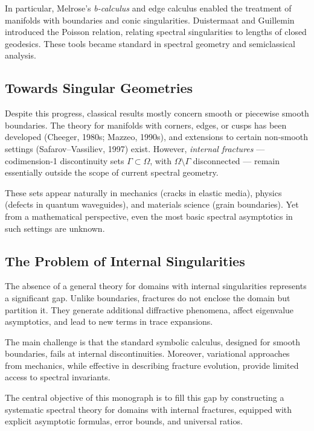 In particular, Melrose's \emph{b-calculus} and edge calculus enabled 
the treatment of manifolds with boundaries and conic singularities. 
Duistermaat and Guillemin introduced the Poisson relation, relating spectral 
singularities to lengths of closed geodesics. These tools became standard 
in spectral geometry and semiclassical analysis.

\subsection{Towards Singular Geometries}

Despite this progress, classical results mostly concern smooth or piecewise smooth 
boundaries. The theory for manifolds with corners, edges, or cusps has been 
developed (Cheeger, 1980s; Mazzeo, 1990s), and extensions to certain 
non-smooth settings (Safarov--Vassiliev, 1997) exist. However, 
\emph{internal fractures} --- codimension-1 discontinuity sets $\Gamma \subset \Omega$, 
with $\Omega \setminus \Gamma$ disconnected --- remain essentially outside the scope 
of current spectral geometry.

These sets appear naturally in mechanics (cracks in elastic media), 
physics (defects in quantum waveguides), and materials science (grain boundaries). 
Yet from a mathematical perspective, even the most basic spectral asymptotics 
in such settings are unknown.

\subsection{The Problem of Internal Singularities}

The absence of a general theory for domains with internal singularities 
represents a significant gap. Unlike boundaries, fractures do not enclose 
the domain but partition it. They generate additional diffractive phenomena, 
affect eigenvalue asymptotics, and lead to new terms in trace expansions. 

The main challenge is that the standard symbolic calculus, designed for smooth 
boundaries, fails at internal discontinuities. Moreover, variational approaches 
from mechanics, while effective in describing fracture evolution, provide 
limited access to spectral invariants.

The central objective of this monograph is to fill this gap by constructing 
a systematic spectral theory for domains with internal fractures, 
equipped with explicit asymptotic formulas, error bounds, and universal ratios.

